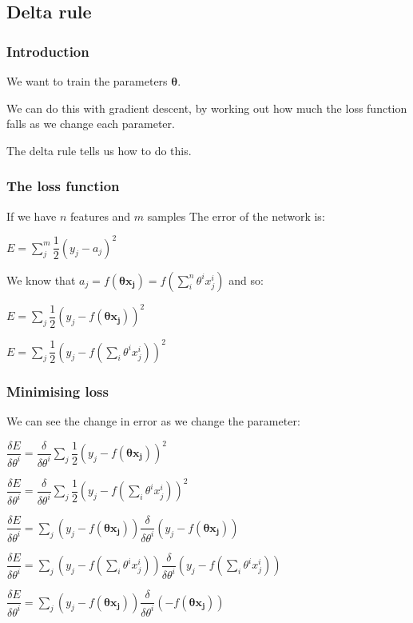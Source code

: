 
\subsection{Delta rule}

\subsubsection{Introduction}

We want to train the parameters \(\boldsymbol{\theta }\).

We can do this with gradient descent, by working out how much the loss function falls as we change each parameter.

The delta rule tells us how to do this.

\subsubsection{The loss function}

If we have \(n\) features and \(m\) samples The error of the network is:

\(E=\sum_j^m\dfrac{1}{2}(y_j-a_j)^2\)

We know that \(a_j=f(\boldsymbol{\theta x_j})=f(\sum_i^n\theta^i x_j^i)\) and so:

\(E=\sum_j\dfrac{1}{2}(y_j-f(\boldsymbol{\theta x_j}))^2\)

\(E=\sum_j\dfrac{1}{2}(y_j-f(\sum_i\theta^i x_j^i))^2\)

\subsubsection{Minimising loss}

We can see the change in error as we change the parameter:

\(\dfrac{\delta E}{\delta \theta^i }=\dfrac{\delta }{\delta \theta^i}\sum_j\dfrac{1}{2}(y_j-f(\boldsymbol{\theta x_j}))^2\)

\(\dfrac{\delta E}{\delta \theta^i }=\dfrac{\delta }{\delta \theta^i}\sum_j\dfrac{1}{2}(y_j-f(\sum_i\theta^i x_j^i))^2\)

\(\dfrac{\delta E}{\delta \theta^i }=\sum_j(y_j-f(\boldsymbol{\theta x_j}))\dfrac{\delta }{\delta \theta^i}(y_j-f(\boldsymbol{\theta x_j}))\)

\(\dfrac{\delta E}{\delta \theta^i }=\sum_j(y_j-f(\sum_i\theta^i x_j^i))\dfrac{\delta }{\delta \theta^i}(y_j-f(\sum_i\theta^i x_j^i))\)

\(\dfrac{\delta E}{\delta \theta^i }=\sum_j(y_j-f(\boldsymbol{\theta x_j}))\dfrac{\delta }{\delta \theta^i}(-f(\boldsymbol{\theta x_j}))\)

